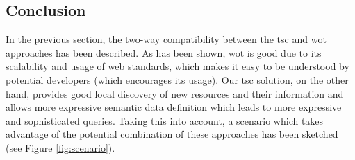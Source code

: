 \subsection{Conclusion}

In the previous section, the two-way compatibility between the \ac{tsc} and \ac{wot} approaches has been described. As has been shown, \ac{wot} is good due to its
scalability and usage of web standards, which makes it easy to be understood by potential developers (which encourages its usage). Our \ac{tsc}
solution, on the other hand, provides good local discovery of new resources and their information and allows more expressive semantic data
definition which leads to more expressive and sophisticated queries. Taking this into account, a scenario which takes advantage of the potential
combination of these approaches has been sketched (see Figure \ref{fig:scenario}).